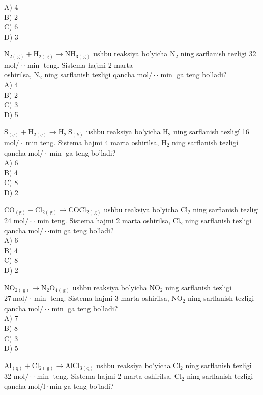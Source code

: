 A) 4\\
B) 2\\
C) 6\\
D) 3
  \item $\mathrm{N}_{2(\mathrm{~g})}+\mathrm{H}_{2(\mathrm{~g})} \rightarrow \mathrm{NH}_{3(\mathrm{~g})}$ ushbu reaksiya bo'yicha $\mathrm{N}_{2}$ ning sarflanish tezligi 32 $\mathrm{mol} / \cdot \cdot \min$ teng. Sistema hajmi 2 marta\\ oshirilsa, $\mathrm{N}_{2}$ ning sarflanish tezligi qancha $\mathrm{mol} / \cdot \cdot \min$ ga teng bo'ladi?\\
A) 4\\
B) 2\\
C) 3\\
D) 5
  \item $\mathrm{S}_{(q)}+\mathrm{H}_{2(q)} \rightarrow \mathrm{H}_{2} \mathrm{~S}_{(k)}$ ushbu reaksiya bo'yicha $\mathrm{H}_{2}$ ning sarflanish tezligí 16 $\mathrm{mol} / \cdot$ min teng. Sistema hajmi 4 marta oshirilsa, $\mathrm{H}_{2}$ ning sarflanish tezligí qancha $\mathrm{mol} / \cdot \min$ ga teng bo'ladi?\\
A) 6\\
B) 4\\
C) 8\\
D) 2
  \item $\mathrm{CO}_{(\mathrm{g})}+\mathrm{Cl}_{2(\mathrm{~g})} \rightarrow \mathrm{COCl}_{2(\mathrm{~g})}$ ushbu reaksiya bo'yicha $\mathrm{Cl}_{2}$ ning sarflanish tezligi 24 $\mathrm{mol} / \cdot \cdot$ min teng. Sistema hajmi 2 marta oshirilsa, $\mathrm{Cl}_{2}$ ning sarflanish tezligi qancha $\mathrm{mol} / \cdot \cdot \mathrm{min}$ ga teng bo'ladi?\\
A) 6\\
B) 4\\
C) 8\\
D) 2
  \item $\mathrm{NO}_{2(\mathrm{~g})} \rightarrow \mathrm{N}_{2} \mathrm{O}_{4(\mathrm{~g})}$ ushbu reaksiya bo'yicha $\mathrm{NO}_{2}$ ning sarflanish tezligi $27 \mathrm{~mol} / \cdot \min$ teng. Sistema hajmi 3 marta oshirilsa, $\mathrm{NO}_{2}$ ning sarflanish tezligi qancha $\mathrm{mol} / \cdot \cdot \min$ ga teng bo'ladi?\\
A) 7\\
B) 8\\
C) 3\\
D) 5
  \item $\mathrm{Al}_{(\mathrm{q})}+\mathrm{Cl}_{2(\mathrm{~g})} \rightarrow \mathrm{AlCl}_{3(\mathrm{q})}$ ushbu reaksiya bo'yicha $\mathrm{Cl}_{2}$ ning sarflanish tezligi 32 $\mathrm{mol} / \cdot \cdot \min$ teng. Sistema hajmi 2 marta oshirilsa, $\mathrm{Cl}_{2}$ ning sarflanish tezligi qancha $\mathrm{mol} / \mathrm{l} \cdot \mathrm{min}$ ga teng bo'ladi?\\
